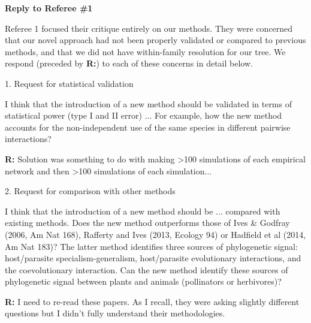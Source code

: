 \documentclass[12pt]{letter}
\newenvironment{refquote}{\bigskip \begin{it}}{\end{it}\smallskip}
\begin{document}
\newpage

\setcounter{page}{1}

{\Large \bf Reply to Referee \#1}


  Referee 1 focused their critique entirely on our methods. They were concerned that our novel approach had not been properly validated or compared to previous methods, and that we did not have within-family resolution for our tree. We respond (preceded by \textbf{R:}) to each of these concerns in detail below.

  1. Request for statistical validation

    \begin{refquote}  

      I think that the introduction of a new method should be validated in terms of statistical power (type I and II error) ... For example, how the new method accounts for the non-independent use of the same species in different pairwise interactions?

    \end{refquote}

    \textbf{R:} Solution was something to do with making >100 simulations of each empirical network and then >100 simulations of each simulation...

  2. Request for comparison with other methods

    \begin{refquote}

      I think that the introduction of a new method should be ... compared with existing methods.  Does the new method outperforms  those of Ives \& Godfray (2006, Am Nat 168),  Rafferty and Ives (2013, Ecology 94) or Hadfield et al (2014, Am Nat 183)? The latter method identifies three sources of phylogenetic signal: host/parasite specialism-generalism, host/parasite evolutionary interactions, and the coevolutionary interaction. Can the new method identify these sources of phylogenetic signal between plants and animals (pollinators or herbivores)?

    \end{refquote}

    \textbf{R:} I need to re-read these papers. As I recall, they were asking slightly different questions but I didn't fully understand their methodologies.
\end{document}
